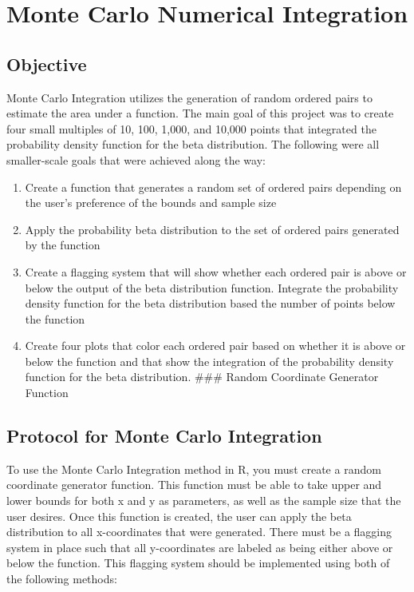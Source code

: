 \documentclass[
  letterpaper,
  DIV=11,
  numbers=noendperiod]{scrartcl}
\providecommand{\tightlist}{%
  \setlength{\itemsep}{0pt}\setlength{\parskip}{0pt}}
\begin{document}
\section{Monte Carlo Numerical
Integration}\label{monte-carlo-numerical-integration}

\subsection{Objective}\label{objective-1}

Monte Carlo Integration utilizes the generation of random ordered pairs
to estimate the area under a function. The main goal of this project was
to create four small multiples of 10, 100, 1,000, and 10,000 points that
integrated the probability density function for the beta distribution.
The following were all smaller-scale goals that were achieved along the
way:

\begin{enumerate}
\def\labelenumi{\arabic{enumi}.}
\tightlist
\item
  Create a function that generates a random set of ordered pairs
  depending on the user's preference of the bounds and sample size
\item
  Apply the probability beta distribution to the set of ordered pairs
  generated by the function
\item
  Create a flagging system that will show whether each ordered pair is
  above or below the output of the beta distribution function. Integrate
  the probability density function for the beta distribution based the
  number of points below the function
\item
  Create four plots that color each ordered pair based on whether it is
  above or below the function and that show the integration of the
  probability density function for the beta distribution. \#\#\# Random
  Coordinate Generator Function
\end{enumerate}

\subsection{Protocol for Monte Carlo
Integration}\label{protocol-for-monte-carlo-integration}

To use the Monte Carlo Integration method in R, you must create a random
coordinate generator function. This function must be able to take upper
and lower bounds for both x and y as parameters, as well as the sample
size that the user desires. Once this function is created, the user can
apply the beta distribution to all x-coordinates that were generated.
There must be a flagging system in place such that all y-coordinates are
labeled as being either above or below the function. This flagging
system should be implemented using both of the following methods:
\end{document}
